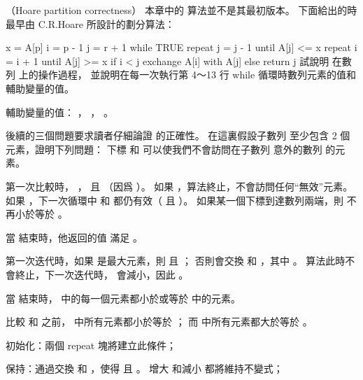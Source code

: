 \startsubject[
  title={Problems},
]

\startPROBLEM
（Hoare partition correctness）
本章中的  算法並不是其最初版本。
下面給出的時最早由 C.R.Hoare 所設計的劃分算法：

\startCLRS
x = A[p]
i = p - 1
j = r + 1
while TRUE
	repeat
		j = j - 1
	until A[j] <= x
	repeat
		i = i + 1
	until A[j] >= x
	if i < j
		exchange A[i] with A[j]
	else
		return j
\stopCLRS
\startigBase[a]
\startitem 試說明  在數列  上的操作過程，
並說明在每一次執行第 4～13 行 {\EMP while} 循環時數列元素的值和輔助變量的值。
\stopitem

\startANSWER
輔助變量的值： ， ， 。

{\externalfigure[output/p7_1_a-1]}
{\externalfigure[output/p7_1_a-2]}
{\externalfigure[output/p7_1_a-3]}
\stopANSWER
\stopigBase

後續的三個問題要求讀者仔細論證  的正確性。
在這裏假設子數列  至少包含 2 個元素，證明下列問題：
\startigBase[a,continue]
\startitem
下標  和  可以使我們不會訪問在子數列  意外的數列  的元素。
\stopitem

\startANSWER
第一次比較時， ，  且  （因爲 ）。
如果 ，算法終止，不會訪問任何“無效”元素。
如果 ，下一次循環中  和  都仍有效（ 且 ）。
如果某一個下標到達數列兩端，則  不再小於等於 。
\stopANSWER

\startitem
當  結束時，他返回的值  滿足 。
\stopitem

\startANSWER
第一次迭代時，如果  是最大元素，則  且 ；
否則會交換  和 ，其中 。
算法此時不會終止，下一次迭代時，  會減小，因此 。
\stopANSWER

\startitem
當  結束時，  中的每一個元素都小於或等於  中的元素。
\stopitem

\startANSWER
比較  和  之前，  中所有元素都小於等於 ；
而  中所有元素都大於等於 。

{\EMP 初始化：}兩個 {\EMP repeat} 塊將建立此條件；

{\EMP 保持：}通過交換  和 ，使得  且 。
增大  和減小  都將維持不變式；

